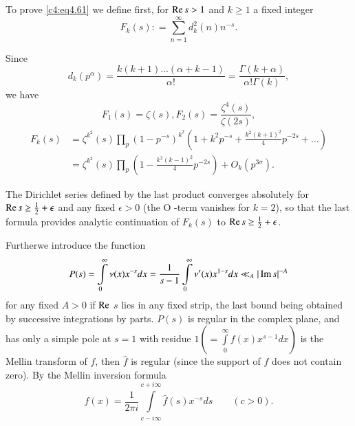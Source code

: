 To prove \eqref{c4:eq4.61} we define first, for $\operatorname{Re} s> 1$ and $k \geq
1$ a fixed integer 
$$
F_k (s) : = \sum_{n=1}^\infty d_k^2 (n) n^{-s}.
$$

Since 
$$
d_k (p^\alpha) = \frac{k(k+1)\ldots (\alpha+ k-1)}{\alpha!} =
\frac{\Gamma (k+ \alpha)}{\alpha! \Gamma (k)},
$$
we have
$$
F_1 (s) = \zeta (s), F_2(s) = \frac{\zeta^4 (s)}{\zeta (2s)},
$$
\begin{align*}
  F_k (s) & = \zeta^{k^2} (s) \prod_p \left(1 - p^{-s}\right)^{k^2}
  \left(1+ k^2 p^{-s} 
    + \frac{k^2 (k+1)^2}{4} p^{-2s}+ \ldots\right)\\
    & = \zeta^{k^2}(s) \prod_p \left( 1- \frac{k^2 (k-1)^2}{4} p^{-2
      s}\right) + O_{k}(p^{3 \sigma}).
\end{align*}

The Dirichlet series defined by the last product converges absolutely
for $\operatorname{Re} s \geq \frac{1}{2} + \epsilon$ and any fixed $\epsilon > 0$
(the O -term vanishes for $k=2$), so that the last formula provides
analytic continuation of $F_k (s)$ to $\operatorname{Re} s \geq \frac{1}{2} +
\epsilon$. 

Further\pageoriginale we introduce the function
$$
P(s) = \int\limits_0^\infty \nu (x) x^{-s} dx = \frac{1}{s-1}
\int\limits_0^\infty \nu' (x) x^{1-s} dx \ll _A |\operatorname{Im} s|^{-A}
$$
for any fixed $A>0$ if $\operatorname{Re}$ $s$ lies in any fixed strip, the last bound
being obtained by successive integrations by parts. $P(s)$ is regular
in the complex plane, and has only a simple pole at $s=1$ with residue
$ 1 \left( = \int\limits_0^\infty f(x) x^{s-1}dx\right) $
is the Mellin transform of $f$, then $\hat{f}$ is regular (since the
support of $f$ does not contain zero). By the Mellin inversion formula
$$
f(x) = \frac{1}{2 \pi i} \int\limits_{c- i \infty}^{c+ i \infty}
\hat{f} (s) x^{-s} ds \qquad (c> 0).
$$

